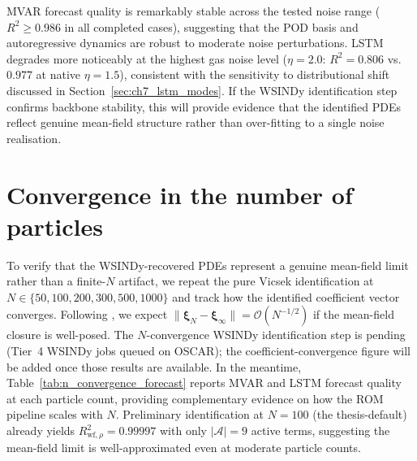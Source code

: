 MVAR forecast quality is remarkably stable across the tested noise range
($R^2 \geq 0.986$ in all completed cases), suggesting that the POD basis
and autoregressive dynamics are robust to moderate noise perturbations.
LSTM degrades more noticeably at the highest gas noise level
($\eta{=}2.0$: $R^2{=}0.806$ vs.\ $0.977$ at native $\eta{=}1.5$),
consistent with the sensitivity to distributional shift discussed in
Section~\ref{sec:ch7_lstm_modes}.
If the WSINDy identification step confirms backbone stability, this will
provide evidence that the identified PDEs reflect genuine mean-field
structure rather than over-fitting to a single noise realisation.

\section{Convergence in the number of particles}
\label{sec:wsindy_n_convergence}

To verify that the WSINDy-recovered PDEs represent a genuine mean-field
limit rather than a finite-$N$ artifact, we repeat the pure Vicsek
identification at $N\in\{50, 100, 200, 300, 500, 1000\}$ and track how
the identified coefficient vector converges.  Following
\cite{messenger2021wsindy}, we expect $\|\boldsymbol{\xi}_N -
\boldsymbol{\xi}_\infty\| = \mathcal{O}(N^{-1/2})$ if the mean-field
closure is well-posed.
The $N$-convergence WSINDy identification step is pending (Tier~4
WSINDy jobs queued on OSCAR); the coefficient-convergence figure will
be added once those results are available.  In the meantime,
Table~\ref{tab:n_convergence_forecast} reports MVAR and LSTM forecast
quality at each particle count, providing complementary evidence on how
the ROM pipeline scales with $N$.
Preliminary identification at $N{=}100$ (the thesis-default)
already yields $R^2_{\text{wf},\rho}=0.99997$ with only $|\mathcal{A}|{=}9$
active terms, suggesting the mean-field limit is well-approximated even at
moderate particle counts.

